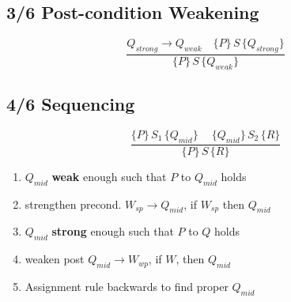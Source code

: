{\subsection*{3/6 Post-condition Weakening}
\begin{displaymath}
  \frac{Q_{strong}\rightarrow Q_{weak} \quad \{P\}\,S\,\{Q_{strong}\} } {\{P\}\,S\,\{Q_{weak}\}}
\end{displaymath}

\subsection*{4/6 Sequencing}
\begin{displaymath}
  \frac{\{P\}\,S_{1}\,\{ Q_{mid}\}\ \quad \{Q_{mid}\}\,S_{2}\,\{R\}}{\{P\}\,S\,\{R\}}
\end{displaymath}
\begin{enumerate}
\item $Q_{mid}$ \textbf{weak} enough such that $P$ to $Q_{mid}$ holds
\item[] strengthen precond. $W_{sp} \rightarrow Q_{mid}$, if $W_{sp}$ then $Q_{mid}$
\item $Q_{mid}$ \textbf{strong} enough such that $P$ to $Q$ holds
\item[] weaken post $Q_{mid} \rightarrow W_{wp}$, if $W$, then $Q_{mid}$
\item Assignment rule backwards to find proper $Q_{mid}$
\end{enumerate}
%
%

}
